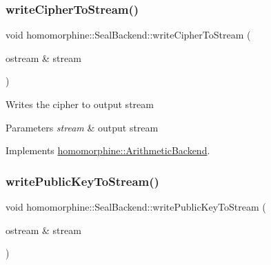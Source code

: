 \mbox{\label{classhomomorphine_1_1_seal_backend_a2d30b67d872ccd9dc572da2bb08b0635}} 
\subsubsection{\texorpdfstring{write\+Cipher\+To\+Stream()}{writeCipherToStream()}}
{\footnotesize\ttfamily void homomorphine\+::\+Seal\+Backend\+::write\+Cipher\+To\+Stream (\begin{DoxyParamCaption}\item[{ostream \&}]{stream }\end{DoxyParamCaption})\hspace{0.3cm}{\ttfamily [virtual]}}

Writes the cipher to output stream


\begin{DoxyParams}{Parameters}
{\em stream} & output stream \\
\hline
\end{DoxyParams}


Implements \hyperlink{classhomomorphine_1_1_arithmetic_backend_a659d4f63a1020d942d561b7fa5e9eddf}{homomorphine\+::\+Arithmetic\+Backend}.

\mbox{\label{classhomomorphine_1_1_seal_backend_af09735f0304cc28e6dc967938a4ad277}} 
\subsubsection{\texorpdfstring{write\+Public\+Key\+To\+Stream()}{writePublicKeyToStream()}}
{\footnotesize\ttfamily void homomorphine\+::\+Seal\+Backend\+::write\+Public\+Key\+To\+Stream (\begin{DoxyParamCaption}\item[{ostream \&}]{stream }\end{DoxyParamCaption})\hspace{0.3cm}{\ttfamily [virtual]}}

